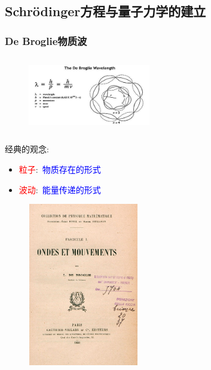 {\subsection{\textrm{Schr\"odinger}方程与量子力学的建立}
\frame
{
	\frametitle{\textrm{De Broglie}物质波}
\begin{minipage}{0.53\textwidth}
\begin{figure}[h!]
\centering
\vspace{-15.5pt}
\includegraphics[height=1.3in,width=2.1in,viewport=0 0 500 280,clip]{Figures/De-Broglie-waves.jpg}
\label{Matter_wave}
\end{figure}
经典的观念:
\begin{itemize}
	\item \textcolor{red}{粒子}:~\textcolor{blue}{物质存在的形式}
	\item \textcolor{red}{波动}:~\textcolor{blue}{能量传递的形式}
\end{itemize}
\end{minipage}
\begin{minipage}{0.45\textwidth}
\begin{figure}[h!]
\centering
\vspace{-15.5pt}
\includegraphics[height=2.80in,width=1.90in,viewport=0 0 430 650,clip]{Figures/De_Broglie-dissertation_Cover.jpg}
\label{De_Broglie-dissertation}
\end{figure}
\end{minipage}
}

}
